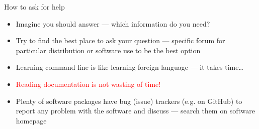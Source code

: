 \documentclass[compress, ucs, xelatex, 11pt, xcolor=svgnames, aspectratio=169,
	hyperref={
		bookmarks=true,
		unicode=true,
		colorlinks=true,
		pdftitle={Linux, command line and MetaCentrum},
		plainpages=false,
		pdfauthor={Vojtech Zeisek},
		pdfsubject={Course about use of Linux command line, writing shell scripts and using MetaCentrum of CESNET},
		pdfcreator={XeLaTeX},
		pdfkeywords={Linux, GNU, BASH, shell, command line, MetaCentrum},
		linkcolor=DarkRed, %
		anchorcolor=DarkBlue, %
		citecolor=Indigo, %
		filecolor=NavyBlue, %
		menucolor=DarkMagenta, %
		urlcolor=DarkBlue, %
		pdftex},
	url={hyphens, lowtilde} %
	]{beamer}
\renewcommand{\alert}[1]{\textcolor{red}{#1}}
\begin{document}
\begin{frame}[allowframebreaks]{How to ask for help}
\begin{itemize}
		\item Imagine you should answer --- which information do you need?
		\item Try to find the best place to ask your question --- specific forum for particular distribution or software use to be the best option
		\item Learning command line is like learning foreign language --- it takes time\ldots
		\item \alert{Reading documentation is not wasting of time!}
		\item Plenty of software packages have bug (issue) trackers (e.g. on GitHub) to report any problem with the software and discuss --- search them on software homepage
	\end{itemize}
\end{frame}
\end{document}

